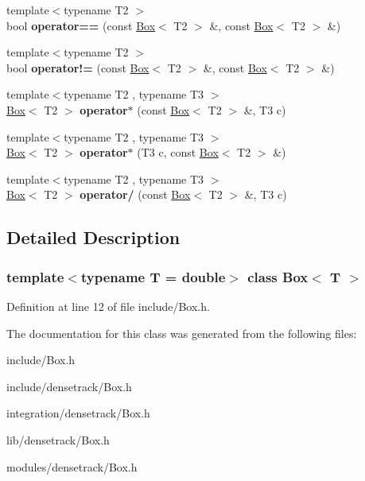 \begin{DoxyCompactItemize}
\item 
\hypertarget{class_box_a6039a2c9a493ae6ba38deb18fd9e6ab1}{
{\footnotesize template$<$typename T2 $>$ }\\bool {\bfseries operator==} (const \hyperlink{class_box}{Box}$<$ T2 $>$ \&, const \hyperlink{class_box}{Box}$<$ T2 $>$ \&)}
\label{class_box_a6039a2c9a493ae6ba38deb18fd9e6ab1}

\item 
\hypertarget{class_box_a5036b46321a1cf15710571b4f5e2a6e6}{
{\footnotesize template$<$typename T2 $>$ }\\bool {\bfseries operator!=} (const \hyperlink{class_box}{Box}$<$ T2 $>$ \&, const \hyperlink{class_box}{Box}$<$ T2 $>$ \&)}
\label{class_box_a5036b46321a1cf15710571b4f5e2a6e6}

\item 
\hypertarget{class_box_a9cc1a4474d25a4b472097480732acc93}{
{\footnotesize template$<$typename T2 , typename T3 $>$ }\\\hyperlink{class_box}{Box}$<$ T2 $>$ {\bfseries operator$\ast$} (const \hyperlink{class_box}{Box}$<$ T2 $>$ \&, T3 c)}
\label{class_box_a9cc1a4474d25a4b472097480732acc93}

\item 
\hypertarget{class_box_acb7a1088a3d15a5d0d515084854da7a6}{
{\footnotesize template$<$typename T2 , typename T3 $>$ }\\\hyperlink{class_box}{Box}$<$ T2 $>$ {\bfseries operator$\ast$} (T3 c, const \hyperlink{class_box}{Box}$<$ T2 $>$ \&)}
\label{class_box_acb7a1088a3d15a5d0d515084854da7a6}

\item 
\hypertarget{class_box_aa7ca8b98d5e0bee623683f0c8a70fda0}{
{\footnotesize template$<$typename T2 , typename T3 $>$ }\\\hyperlink{class_box}{Box}$<$ T2 $>$ {\bfseries operator/} (const \hyperlink{class_box}{Box}$<$ T2 $>$ \&, T3 c)}
\label{class_box_aa7ca8b98d5e0bee623683f0c8a70fda0}

\end{DoxyCompactItemize}


\subsection{Detailed Description}
\subsubsection*{template$<$typename T = double$>$ class Box$<$ T $>$}



Definition at line 12 of file include/Box.h.



The documentation for this class was generated from the following files:\begin{DoxyCompactItemize}
\item 
include/Box.h\item 
include/densetrack/Box.h\item 
integration/densetrack/Box.h\item 
lib/densetrack/Box.h\item 
modules/densetrack/Box.h\end{DoxyCompactItemize}
